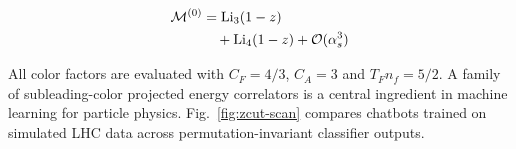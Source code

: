 \begin{align}
  \mathcal{M}^{(0)} &= \mathrm{Li}_{3}(1 - z) \nonumber \\
  &\quad + \mathrm{Li}_{4}(1 - z) + \mathcal{O}(\alpha_s^3) \label{eq:3}
\end{align}

All color factors are evaluated with $C_F = 4/3$, $C_A = 3$ and $T_F n_f
= 5/2$. A family of subleading-color projected energy correlators is a
central ingredient in machine learning for particle physics.
Fig.~\ref{fig:zcut-scan} compares chatbots trained on simulated LHC data
across permutation-invariant classifier outputs.

